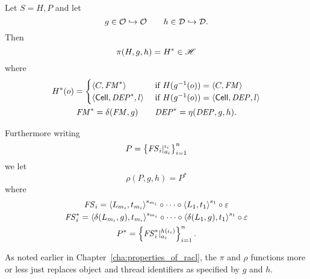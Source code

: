 \begin{definition} \label{def:pirho}
  Let $S = H, P$ and let 
  \begin{equation*}
    g \in \mathcal{O} \hookrightarrow \mathcal{O} \quad\quad h \in \mathcal{D} \hookrightarrow \mathcal{D} .
  \end{equation*}
  Then 
  \begin{equation}
    \pi(H, g, h) = H^* \in \mathscr{H}
  \end{equation}
  where
  \begin{equation}
    \begin{gathered}
      H^*(o) =
      \begin{cases}
        \mbox{$\langle C, \mathit{FM}^* \rangle$}   & \text{ if } H(g^{-1}(o)) = \mbox{$\langle C, \mathit{FM} \rangle$} \\
        \mbox{$\langle \mbox{$\mathsf{Cell}$}{}, \mathit{DEP}^*, l \rangle$} & \text{ if } H(g^{-1}(o)) = \mbox{$\langle \mbox{$\mathsf{Cell}$}{}, \mathit{DEP}, l \rangle$}
      \end{cases} \\
      \mathit{FM}^* = \delta(\mathit{FM}, g) \quad\quad \mathit{DEP}^* = \eta(\mathit{DEP}, g, h).
    \end{gathered}
  \end{equation}

  Furthermore writing
  \begin{equation}
    P = \left\{ \mathit{FS}_i|_{a_i}^{\iota_i} \right\}_{i = 1}^n
  \end{equation}
  we let
  \begin{equation*}
    \rho(P, g, h) = P^*
  \end{equation*}
  where
  \begin{equation*}
    \begin{gathered}
      \mathit{FS}_i = \mbox{$\langle L_{m_i}, t_{m_i} \rangle$}^{s_{m_i}} \circ \dots \circ \mbox{$\langle L_1,
      t_1 \rangle$}^{s_1} \circ \varepsilon \\
      \mathit{FS}_i^* = \mbox{$\langle \delta(L_{m_i}, g), t_{m_i} \rangle$}^{s_{m_i}} \circ \dots \circ
      \mbox{$\langle \delta(L_1,g), t_1 \rangle$}^{s_1} \circ \varepsilon \\
      P^* = \left\{ \mathit{FS}_i^*|_{a_i}^{h(\iota_i)} \right\}_{i = 1}^n.
    \end{gathered}
  \end{equation*}
\end{definition}

\begin{remark}
  As noted earlier in Chapter~\ref{cha:properties_of_racl}, the $\pi$ and $\rho$
  functions more or less just replaces object and thread identifiers as
  specified by $g$ and $h$.
\end{remark}


